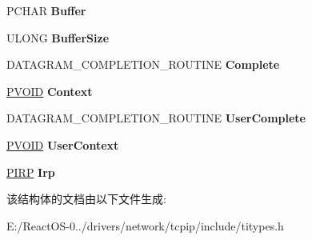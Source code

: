 \begin{DoxyCompactItemize}
\item 
\mbox{\label{struct___d_a_t_a_g_r_a_m___r_e_c_e_i_v_e___r_e_q_u_e_s_t_ae05dea0b812f4f61ea95d107e33ba83b}} 
P\+C\+H\+AR {\bfseries Buffer}
\item 
\mbox{\label{struct___d_a_t_a_g_r_a_m___r_e_c_e_i_v_e___r_e_q_u_e_s_t_a2c8d291b0f009a29bc2658202c3c542c}} 
U\+L\+O\+NG {\bfseries Buffer\+Size}
\item 
\mbox{\label{struct___d_a_t_a_g_r_a_m___r_e_c_e_i_v_e___r_e_q_u_e_s_t_a279cdb5ef617a587b68c3b7bf330491b}} 
D\+A\+T\+A\+G\+R\+A\+M\+\_\+\+C\+O\+M\+P\+L\+E\+T\+I\+O\+N\+\_\+\+R\+O\+U\+T\+I\+NE {\bfseries Complete}
\item 
\mbox{\label{struct___d_a_t_a_g_r_a_m___r_e_c_e_i_v_e___r_e_q_u_e_s_t_a3912a991ae3e75d0ce16d0d7cf310b83}} 
\hyperlink{interfacevoid}{P\+V\+O\+ID} {\bfseries Context}
\item 
\mbox{\label{struct___d_a_t_a_g_r_a_m___r_e_c_e_i_v_e___r_e_q_u_e_s_t_ae4d61ea1d47879d36d166f22fc6b9a1c}} 
D\+A\+T\+A\+G\+R\+A\+M\+\_\+\+C\+O\+M\+P\+L\+E\+T\+I\+O\+N\+\_\+\+R\+O\+U\+T\+I\+NE {\bfseries User\+Complete}
\item 
\mbox{\label{struct___d_a_t_a_g_r_a_m___r_e_c_e_i_v_e___r_e_q_u_e_s_t_a16ad298956c4f329fed5c80b058dbfad}} 
\hyperlink{interfacevoid}{P\+V\+O\+ID} {\bfseries User\+Context}
\item 
\mbox{\label{struct___d_a_t_a_g_r_a_m___r_e_c_e_i_v_e___r_e_q_u_e_s_t_a409fcbc286090e513f6990a2109f701b}} 
\hyperlink{interfacevoid}{P\+I\+RP} {\bfseries Irp}
\end{DoxyCompactItemize}


该结构体的文档由以下文件生成\+:\begin{DoxyCompactItemize}
\item 
E\+:/\+React\+O\+S-\/0../drivers/network/tcpip/include/titypes.\+h\end{DoxyCompactItemize}
